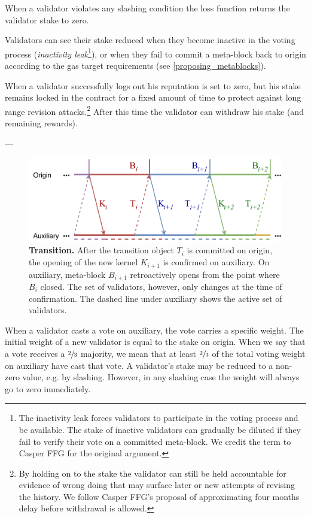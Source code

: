 \documentclass[12pt,a4paper]{article}
\begin{document}
When a validator violates any slashing condition the loss function returns the validator stake to zero.

Validators can see their stake reduced when they become inactive in the voting process (\emph{inactivity leak}\footnote{
  The inactivity leak forces validators to participate in the voting process and be available.  The stake of inactive validators can gradually be diluted if they fail to verify their vote on a committed meta-block.  We credit the term to Casper FFG\cite{casperffg} for the original argument.
}), or when they fail to commit a meta-block back to origin according to the gas target requirements (see  \ref{proposing_metablocks}).

When a validator successfully logs out his reputation is set to zero, but his stake remains locked in the contract for a fixed amount of time to protect against long range revision attacks.\footnote{
  By holding on to the stake the validator can still be held accountable for evidence of wrong doing that may surface later or new attempts of revising the history.
  We follow Casper FFG's proposal of approximating four months delay before withdrawal is allowed.}
After this time the validator can withdraw his stake (and remaining rewards).

---


\begin{figure}[htb]
    \centering
	\includegraphics[width=\textwidth]{transition}
	\caption{\textbf{Transition.}
		After the transition object $T_i$ is committed on origin, the opening of the new kernel $K_{i+1}$ is confirmed on auxiliary.
		On auxiliary, meta-block $B_{i+1}$ retroactively opens from the point where $B_i$ closed.
		The set of validators, however, only changes at the time of confirmation.
		The dashed line under auxiliary shows the active set of validators.
	}
	\label{fig:transition}
\end{figure}

When a validator casts a vote on auxiliary, the vote carries a specific weight.
The initial weight of a new validator is equal to the stake on origin.
When we say that a vote receives a $\sfrac{2}{3}$ majority, we mean that at least $\sfrac{2}{3}$ of the total voting weight on auxiliary have cast that vote.
A validator's stake may be reduced to a non-zero value, e.g. by slashing.
However, in any slashing case the weight will always go to zero immediately.
\end{document}
